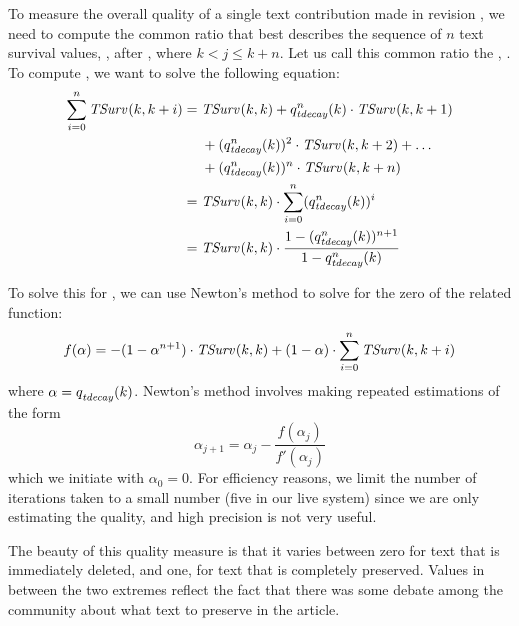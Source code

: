 To measure the overall quality of a single text contribution
made in revision , we need to compute the common ratio
that best describes the sequence of $n$ text survival values,
, after , where $k < j \le k+n$.
Let us call this common ratio the ,
.
To compute , we want to solve the following equation:
\begin{align*}
    \sum_{i=0}^n \tsurv{}{k,k+i} = {} & \tsurv{}{k,k} + \quality{tdecay}{n}{k} \cdot \tsurv{}{k,k+1} \\
    & + (\quality{tdecay}{n}{k})^2 \cdot \tsurv{}{k,k+2} + \ldots \\
    & + (\quality{tdecay}{n}{k})^n \cdot \tsurv{}{k,k+n} \\
    = {} & \tsurv{}{k,k} \cdot \sum_{i=0}^n (\quality{tdecay}{n}{k})^i \\
    = {} & \tsurv{}{k,k} \cdot \frac{1 - (\quality{tdecay}{n}{k})^{n+1}}{1 - \quality{tdecay}{n}{k}} \\
\end{align*}

To solve this for , we can use Newton's method
to solve for the zero of the related function:
\begin{equation}
  f(\alpha) =
        - (1 - \alpha^{n+1}) \cdot \tsurv{}{k,k}
        + (1 - \alpha) \cdot \sum_{i=0}^n \tsurv{}{k,k+i}
\label{eq:soln-tdecay}
\end{equation}
where $\alpha = \quality{tdecay}{}{k}$.
Newton's method involves making repeated estimations of the form
\begin{equation*}
  \alpha_{j+1} = \alpha_j - \frac{f(\alpha_j)}{f'(\alpha_j)}
\end{equation*}
which we initiate with $\alpha_0 = 0$.
For efficiency reasons, we limit the number of iterations taken
to a small number (five in our live system)
since we are only estimating the quality, and high precision
is not very useful.

The beauty of this quality measure is that it varies between
zero for text that is immediately deleted, and one, for text
that is completely preserved.
Values in between the two extremes reflect the fact that there
was some debate among the community about what text to preserve
in the article.

